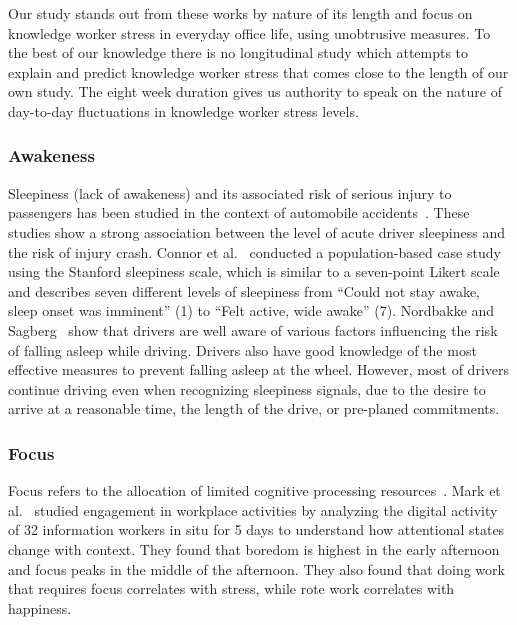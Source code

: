 Our study stands out from these works by nature of its length and focus on knowledge worker stress in everyday office life, using unobtrusive measures. To the best of our knowledge there is no longitudinal study which attempts to explain and predict knowledge worker stress that comes close to the length of our own study. The eight week duration gives us authority to speak on the nature of day-to-day fluctuations in knowledge worker stress levels.

\subsubsection{Awakeness}

Sleepiness (lack of awakeness) and its associated risk of serious injury to passengers has been studied in the context of automobile 
accidents~\cite{connor02,Nordbakke07}.
These studies show a strong association between the level of acute driver sleepiness and the risk of injury crash.
Connor et al.~\cite{connor02} conducted a population-based case study using the Stanford sleepiness scale, which is similar to a seven-point Likert scale and describes seven different levels of sleepiness from ``Could not stay awake, sleep onset was imminent'' (1) to ``Felt active, wide awake'' (7).
Nordbakke and Sagberg~\cite{Nordbakke07} show that drivers are well aware of  various factors influencing the risk of falling asleep while driving. Drivers also have good knowledge of the most effective measures to prevent falling asleep at the wheel.
However, most of drivers continue driving even when recognizing sleepiness signals, due to the desire to arrive at a reasonable time, the length of the drive, or pre-planed commitments.



\subsubsection{Focus}
Focus refers to the allocation of limited cognitive processing resources~\cite{Anderson04}.
Mark et al.~\cite{mark2014bored} studied engagement in workplace activities by analyzing the digital activity of 32 information workers in situ for 5 days to understand how attentional states change with context. They found that boredom is highest in the early afternoon and focus peaks in the middle of the afternoon. They also found that doing work that requires focus correlates with stress, while rote work correlates with happiness.

